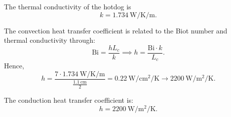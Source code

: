 \begin{derivation}
  \begin{subresult}
    The thermal conductivity of the hotdog is
    \begin{equation*}
      k = \qty{1,734}{\W\per\K\per\m}
    .\end{equation*}
  \end{subresult}

  \derivationpart

  The convection heat transfer coefficient is related to the Biot number and thermal conductivity through:
  \begin{equation*}
    \mathrm{Bi} = \frac{h L_c}{k} \implies h = \frac{\mathrm{Bi} \cdot k}{L_c}
  .\end{equation*}
  Hence,
  \begin{equation*}
    h = \frac{7 \cdot \qty{1,734}{\W\per\K\per\m}}{\frac{\qty{1,1}{\cm}}{2}} = \qty{0.22}{\W\per\cm\squared\per\K} \rightarrow \qty{2200}{\W\per\m\squared\per\K} 
  .\end{equation*}
  
  \begin{subresult}
    The conduction heat transfer coefficient is:
    \begin{equation*}
      h = \qty{2200}{\W\per\m\squared\per\K} 
    .\end{equation*}
  \end{subresult}
\end{derivation}
